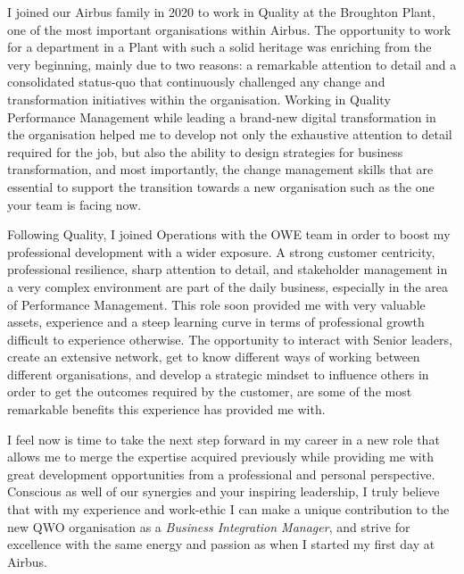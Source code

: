 \documentclass[11pt,a4paper]{letter}
\begin{document}
{\setlength{\parindent}{5mm}
  

I joined our Airbus family in 2020 to work in Quality at the Broughton Plant, one of the most important organisations within Airbus. The opportunity to work for a department in a Plant with such a solid heritage was enriching from the very beginning, mainly due to two reasons: a remarkable attention to detail and a consolidated status-quo that continuously challenged any change and transformation initiatives within the organisation. Working in Quality Performance Management while leading a brand-new digital transformation in the organisation helped me to develop not only the exhaustive attention to detail required for the job, but also the ability to design strategies for business transformation, and most importantly, the change management skills that are essential to support the transition towards a new organisation such as the one your team is facing now.

 
Following Quality, I joined Operations with the OWE team in order to boost my professional development with a wider exposure. A strong customer centricity, professional resilience, sharp attention to detail, and stakeholder management in a very complex environment are part of the daily business, especially in the area of Performance Management. This role soon provided me with very valuable assets, experience and a steep learning curve in terms of professional growth difficult to experience otherwise. The opportunity to interact with Senior leaders, create an extensive network, get to know different ways of working between different organisations, and develop a strategic mindset to influence others in order to get the outcomes required by the customer, are some of the most remarkable benefits this experience has provided me with.

I feel now is time to take the next step forward in my career in a new role that allows me to merge the expertise acquired previously while providing me with great development opportunities from a professional and personal perspective. Conscious as well of our synergies and your inspiring leadership, I truly believe that with my experience and work-ethic I can make a unique contribution to the new QWO organisation as a \textit{Business Integration Manager}, and strive for excellence with the same energy and passion as when I started my first day at Airbus.


}
\end{document}
